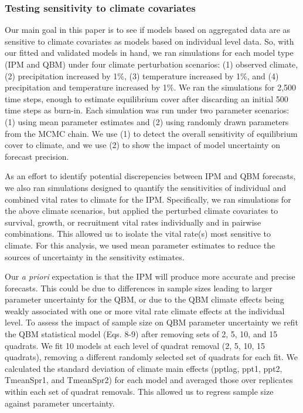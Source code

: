 \documentclass[12pt,]{article}
\begin{document}
\subsubsection{Testing sensitivity to climate
covariates}\label{testing-sensitivity-to-climate-covariates}

Our main goal in this paper is to see if models based on aggregated data
are as sensitive to climate covariates as models based on individual
level data. So, with our fitted and validated models in hand, we ran
simulations for each model type (IPM and QBM) under four climate
perturbation scenarios: (1) observed climate, (2) precipitation
increased by 1\%, (3) temperature increased by 1\%, and (4)
precipitation and temperature increased by 1\%. We ran the simulations
for 2,500 time steps, enough to estimate equilibrium cover after
discarding an initial 500 time steps as burn-in. Each simulation was run
under two parameter scenarios: (1) using mean parameter estimates and
(2) using randomly drawn parameters from the MCMC chain. We use (1) to
detect the overall sensitivity of equilibrium cover to climate, and we
use (2) to show the impact of model uncertainty on forecast precision.

As an effort to identify potential discrepencies between IPM and QBM
forecasts, we also ran simulations designed to quantify the
sensitivities of individual and combined vital rates to climate for the
IPM. Specifically, we ran simulations for the above climate scenarios,
but applied the perturbed climate covariates to survival, growth, or
recruitment vital rates individually and in pairwise combinations. This
allowed us to isolate the vital rate(s) most sensitive to climate. For
this analysis, we used mean parameter estimates to reduce the sources of
uncertainty in the sensitivity estimates.

Our \emph{a priori} expectation is that the IPM will produce more
accurate and precise forecasts. This could be due to differences in
sample sizes leading to larger parameter uncertainty for the QBM, or due
to the QBM climate effects being weakly associated with one or more
vital rate climate effects at the individual level. To assess the impact
of sample size on QBM parameter uncertainty we refit the QBM statistical
model (Eqs. 8-9) after removing sets of 2, 5, 10, and 15 quadrats. We
fit 10 models at each level of quadrat removal (2, 5, 10, 15 quadrats),
removing a different randomly selected set of quadrats for each fit. We
calculated the standard deviation of climate main effects (pptlag, ppt1,
ppt2, TmeanSpr1, and TmeanSpr2) for each model and averaged those over
replicates within each set of quadrat removals. This allowed us to
regress sample size against parameter uncertainty.
\end{document}
